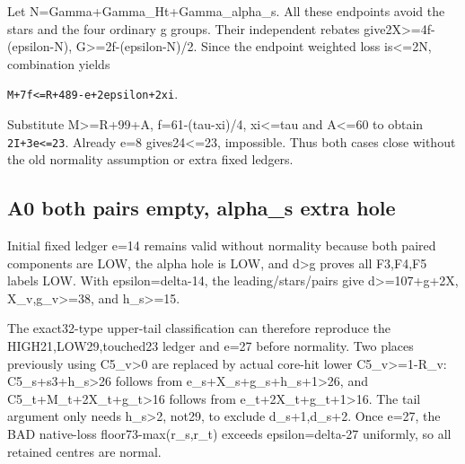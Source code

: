 \documentclass[10pt,a4paper]{article}
\theoremstyle{definition}
\begin{document}
Let N=\allowbreak{}Gamma+\allowbreak{}Gamma\_\allowbreak{}Ht+\allowbreak{}Gamma\_\allowbreak{}alpha\_\allowbreak{}s. All these endpoints avoid the
stars and the four ordinary g groups. Their independent rebates
give2X\textgreater=\allowbreak{}4f-(epsilon-N),\allowbreak{} G\textgreater=\allowbreak{}2f-(epsilon-N)/2. Since
the endpoint weighted loss is\textless=\allowbreak{}2N,\allowbreak{} combination yields

\texttt{M+\allowbreak{}7f<=\allowbreak{}R+\allowbreak{}489-e+\allowbreak{}2epsilon+\allowbreak{}2xi}.

Substitute M\textgreater=\allowbreak{}R+\allowbreak{}99+\allowbreak{}A,\allowbreak{} f=\allowbreak{}61-(tau-xi)/4,\allowbreak{} xi\textless=\allowbreak{}tau and
A\textless=\allowbreak{}60 to obtain \texttt{2I+\allowbreak{}3e<=\allowbreak{}23}. Already e=\allowbreak{}8
gives24\textless=\allowbreak{}23,\allowbreak{} impossible. Thus both cases close without the old
normality assumption or extra fixed ledgers.

\hypertarget{a0-both-pairs-empty-alpha_s-extra-hole}{%
\subsection{A0 both pairs empty,\allowbreak{} alpha\_\allowbreak{}s extra
hole}\label{a0-both-pairs-empty-alpha_s-extra-hole}}

Initial fixed ledger e=\allowbreak{}14 remains valid without normality because both
paired components are LOW,\allowbreak{} the alpha hole is LOW,\allowbreak{} and d\textgreater g
proves all F3,\allowbreak{}F4,\allowbreak{}F5 labels LOW. With epsilon=\allowbreak{}delta-14,\allowbreak{} the
leading/stars/pairs give d\textgreater=\allowbreak{}107+\allowbreak{}g+\allowbreak{}2X,\allowbreak{}
X\_\allowbreak{}v,\allowbreak{}g\_\allowbreak{}v\textgreater=\allowbreak{}38,\allowbreak{} and h\_\allowbreak{}s\textgreater=\allowbreak{}15.

The exact32-type upper-tail classification can therefore reproduce the
HIGH21,\allowbreak{}LOW29,\allowbreak{}touched23 ledger and e=\allowbreak{}27 before normality. Two places
previously using C5\_\allowbreak{}v\textgreater0 are replaced by actual core-hit
lower C5\_\allowbreak{}v\textgreater=\allowbreak{}1-R\_\allowbreak{}v: C5\_\allowbreak{}s+\allowbreak{}s3+\allowbreak{}h\_\allowbreak{}s\textgreater26 follows from
e\_\allowbreak{}s+\allowbreak{}X\_\allowbreak{}s+\allowbreak{}g\_\allowbreak{}s+\allowbreak{}h\_\allowbreak{}s+\allowbreak{}1\textgreater26,\allowbreak{} and
C5\_\allowbreak{}t+\allowbreak{}M\_\allowbreak{}t+\allowbreak{}2X\_\allowbreak{}t+\allowbreak{}g\_\allowbreak{}t\textgreater16 follows from
e\_\allowbreak{}t+\allowbreak{}2X\_\allowbreak{}t+\allowbreak{}g\_\allowbreak{}t+\allowbreak{}1\textgreater16. The tail argument only needs
h\_\allowbreak{}s\textgreater2,\allowbreak{} not29,\allowbreak{} to exclude d\_\allowbreak{}s+\allowbreak{}1,\allowbreak{}d\_\allowbreak{}s+\allowbreak{}2. Once e=\allowbreak{}27,\allowbreak{} the BAD
native-loss floor73-max(r\_\allowbreak{}s,\allowbreak{}r\_\allowbreak{}t) exceeds epsilon=\allowbreak{}delta-27 uniformly,\allowbreak{}
so all retained centres are normal.
\end{document}
